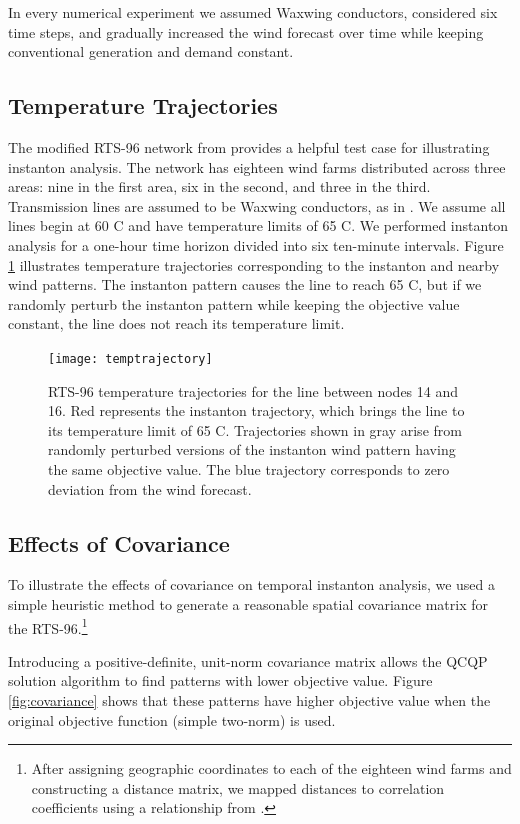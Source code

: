 \documentclass[journal,twoside]{IEEEtran}
\begin{document}
In every numerical experiment we assumed Waxwing conductors, considered six time steps, and gradually increased the wind forecast over time while keeping conventional generation and demand constant.

\subsection{Temperature Trajectories}
The modified RTS-96 network from \cite{pandzic} provides a helpful test case for illustrating instanton analysis. The network has eighteen wind farms distributed across three areas: nine in the first area, six in the second, and three in the third. Transmission lines are assumed to be Waxwing conductors, as in \cite{almassalkhi2015}. We assume all lines begin at 60 C and have temperature limits of 65 C. We performed instanton analysis for a one-hour time horizon divided into six ten-minute intervals. Figure \ref{fig:temptrajectory} illustrates temperature trajectories corresponding to the instanton and nearby wind patterns. The instanton pattern causes the line to reach 65 C, but if we randomly perturb the instanton pattern while keeping the objective value constant, the line does not reach its temperature limit.

\begin{figure}
\centering
\texttt{[image: temptrajectory]}
\caption{RTS-96 temperature trajectories for the line between nodes 14 and 16. Red represents the instanton trajectory, which brings the line to its temperature limit of 65 C. Trajectories shown in gray arise from randomly perturbed versions of the instanton wind pattern having the same objective value. The blue trajectory corresponds to zero deviation from the wind forecast.}
\label{fig:temptrajectory}
\end{figure}

\subsection{Effects of Covariance}
To illustrate the effects of covariance on temporal instanton analysis, we used a simple heuristic method to generate a reasonable spatial covariance matrix for the RTS-96.\footnote{After assigning geographic coordinates to each of the eighteen wind farms and constructing a distance matrix, we mapped distances to correlation coefficients using a relationship from \cite{freris2008}.}

Introducing a positive-definite, unit-norm covariance matrix allows the QCQP solution algorithm to find patterns with lower objective value. Figure \ref{fig:covariance} shows that these patterns have higher objective value when the original objective function (simple two-norm) is used.
\end{document}
